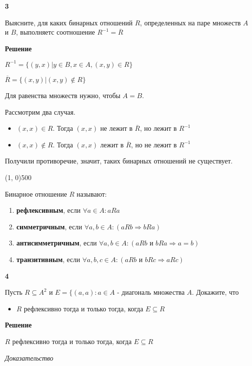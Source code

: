 \documentclass{article}
\begin{document}
\textbf{3}

Выясните, для каких бинарных отношений $R$, определенных на паре множеств $A$ и $B$, выполняетс соотношение $R^{-1} = \overline{R}$

\textbf{Решение}

$R^{-1} = \{ (y, x) | y \in B, x \in A, (x, y) \in R \}$

$\overline{R} = \{ (x, y) | (x, y) \notin R\}$

Для равенства множеств нужно, чтобы $A = B$.

 Рассмотрим два случая. 
 
\begin{itemize}
    \item $(x, x) \in R$. Тогда $(x, x)$ не лежит в $\overline{R}$, но лежит в $R^{-1}$
    \item $(x, x) \notin R$. Тогда $(x, x)$ лежит в $\overline{R}$, но не лежит в $R^{-1}$
\end{itemize}

Получили противоречие, значит, таких бинарных отношений не существует.

\line(1, 0){500}

Бинарное отношение $R$ называют:
	\begin{enumerate}
		\item \textbf{рефлексивным}, если $\forall a \in A: aRa$
		\item \textbf{симметричным}, если $\forall a, b \in A: (aRb \Longrightarrow bRa)$
		\item \textbf{антисимметричным}, если $\forall a, b \in A: (aRb \text{ и } bRa \Longrightarrow a = b)$
		\item \textbf{транзитивным}, если $\forall a, b, c \in A: (aRb \text{ и } bRc \Longrightarrow aRc)$
	\end{enumerate}


\textbf{4}

Пусть $R \subseteq A^2$ и  $E = \{(a, a) : a\in A$ - диагональ множества $A$. Докажите, что 

\begin{itemize}
    \item $R$ рефлексивно тогда и только тогда, когда $E \subseteq R$
    
\end{itemize}

\textbf{Решение}

$R$ рефлексивно тогда и только тогда, когда $E \subseteq R$

\textit{Доказательство}
\end{document}
